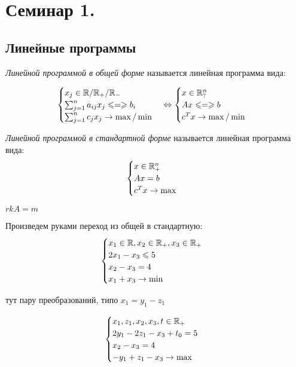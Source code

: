 \section*{Семинар 1.}
\subsection*{Линейные программы}


\begin{definition}
	\emph{Линейной программой в общей форме} называется линейная программа вида:
\end{definition}

\[
	\begin{cases}
		x_j \in \mathbb{R} / \mathbb{R}_+ / \mathbb{R}_-\\
		\sum_{j = 1}^{n} a_{i j} x_j \leqslant = \geqslant b_i\\
		\sum_{j = 1}^n c_j x_j \to \max / \min
	\end{cases}
	\Leftrightarrow
	\begin{cases}
		x \in \mathbb{R}^n_{?}\\
		A x \leqslant = \geqslant b \\
		c^T x \to \max / \min
	\end{cases}
\]

\begin{definition}
	\emph{Линейной программой в стандартной форме} называется линейная программа вида:
\[
	\begin{cases}
		x \in \mathbb{R}^n_+\\
		A x = b\\
		c^T x \to \max
	\end{cases}
\]

$rk A = m$
\end{definition}

Произведем руками переход из общей в стандартную:
\[
	\begin{cases}
		x_1 \in	\mathbb{R}, x_2 \in \mathbb{R}_+, x_3 \in \mathbb{R}_+\\
		2 x_1 - x_3 \leqslant 5\\
		x_2 - x_3 = 4\\
		x_1 + x_3 \to \min
	\end{cases}
\]

тут пару преобразований, типо $x_1 = y_1 - z_1$

\[
	\begin{cases}
		x_1, z_1, x_2, x_3, t \in \mathbb{R}_+\\
		2 y_1 - 2 z_1 - x_3 + t_0 = 5\\
		x_2 - x_3 = 4\\
		-y_1 + z_1 - x_3 \to \max
	\end{cases}
\]

